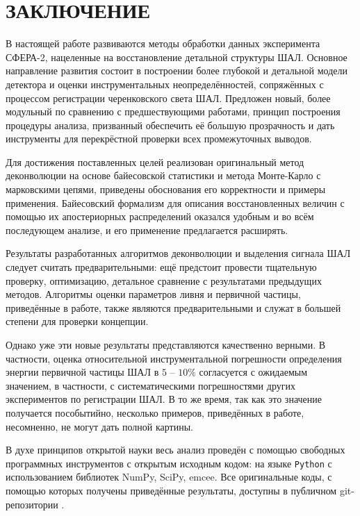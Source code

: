 \chapter*{ЗАКЛЮЧЕНИЕ}

В настоящей работе развиваются методы обработки данных эксперимента СФЕРА-2, нацеленные на восстановление детальной структуры ШАЛ. Основное направление развития состоит в построении более глубокой и детальной модели детектора и оценки инструментальных неопределённостей, сопряжённых с процессом регистрации черенковского света ШАЛ. Предложен новый, более модульный по сравнению с предшествующими работами, принцип построения процедуры анализа, призванный обеспечить её большую прозрачность и дать инструменты для перекрёстной проверки всех промежуточных выводов.

Для достижения поставленных целей реализован оригинальный метод деконволюции на основе байесовской статистики и метода Монте-Карло с марковскими цепями, приведены обоснования его корректности и примеры применения. Байесовский формализм для описания восстановленных величин с помощью их апостериорных распределений оказался удобным и во всём последующем анализе, и его применение предлагается расширять.

Результаты разработанных алгоритмов деконволюции и выделения сигнала ШАЛ следует считать предварительными: ещё предстоит провести тщательную проверку, оптимизацию, детальное сравнение с результатами предыдущих методов. Алгоритмы оценки параметров ливня и первичной частицы, приведённые в работе, также являются предварительными и служат в большей степени для проверки концепции.

Однако уже эти новые результаты представляются качественно верными. В частности, оценка относительной инструментальной погрешности определения энергии первичной частицы ШАЛ в $5$ -- $10 \%$ согласуется с ожидаемым значением, в частности, с систематическими погрешностями других экспериментов по регистрации ШАЛ. В то же время, так как это значение получается пособытийно, несколько примеров, приведённых в работе, несомненно, не могут дать полной картины.

В духе принципов открытой науки весь анализ проведён с помощью свободных программных инструментов с открытым исходным кодом: на языке \verb|Python| с использованием библиотек NumPy, SciPy, emcee. Все оригинальные коды, с помощью которых получены приведённые результаты, доступны в публичном git-репозитории .
